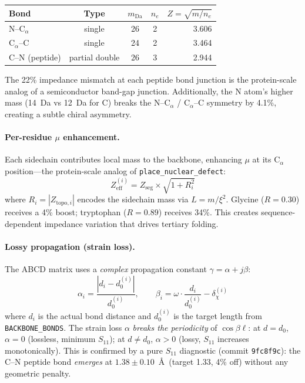 \begin{center}
\begin{tabular}{@{}l c c c r@{}}
\toprule
\textbf{Bond} & \textbf{Type} & $m_\text{Da}$ & $n_e$ & $Z = \sqrt{m/n_e}$ \\
\midrule
N--C$_\alpha$ & single & 26 & 2 & 3.606 \\
C$_\alpha$--C & single & 24 & 2 & 3.464 \\
C--N (peptide) & partial double & 26 & 3 & 2.944 \\
\bottomrule
\end{tabular}
\end{center}
The 22\% impedance mismatch at each peptide bond junction is the protein-scale analog of a semiconductor band-gap junction.  Additionally, the N atom's higher mass (14~Da vs 12~Da for C) breaks the N--C$_\alpha$ / C$_\alpha$--C symmetry by 4.1\%, creating a subtle chiral asymmetry.

\paragraph{Per-residue $\mu$ enhancement.}
Each sidechain contributes local mass to the backbone, enhancing $\mu$ at its C$_\alpha$ position---the protein-scale analog of \texttt{place\_nuclear\_defect}:
\begin{equation}
    Z_\text{eff}^{(i)} = Z_\text{seg} \times \sqrt{1 + R_i^2}
    \label{eq:z_eff_mu}
\end{equation}
where $R_i = |Z_{\text{topo},i}|$ encodes the sidechain mass via $L = m/\xi^2$.  Glycine ($R = 0.30$) receives a 4\% boost; tryptophan ($R = 0.89$) receives 34\%.  This creates sequence-dependent impedance variation that drives tertiary folding.

\paragraph{Lossy propagation (strain loss).}
The ABCD matrix uses a \emph{complex} propagation constant $\gamma = \alpha + j\beta$:
\begin{equation}
    \alpha_i = \frac{|d_i - d_0^{(i)}|}{d_0^{(i)}}, \qquad \beta_i = \omega \cdot \frac{d_i}{d_0^{(i)}} - \delta_\chi^{(i)}
    \label{eq:complex_gamma}
\end{equation}
where $d_i$ is the actual bond distance and $d_0^{(i)}$ is the target length from \texttt{BACKBONE\_BONDS}.  The strain loss $\alpha$ \emph{breaks the periodicity} of $\cos\beta\ell$: at $d = d_0$, $\alpha = 0$ (lossless, minimum $S_{11}$); at $d \neq d_0$, $\alpha > 0$ (lossy, $S_{11}$ increases monotonically).  This is confirmed by a pure $S_{11}$ diagnostic (commit \texttt{9fc8f9c}): the C--N peptide bond \emph{emerges} at $1.38 \pm 0.10$~\AA\ (target 1.33, 4\% off) without any geometric penalty.

